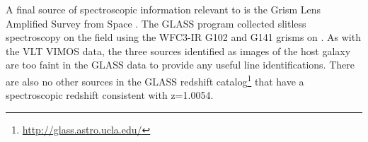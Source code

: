 A final source of spectroscopic information relevant to \spock is the
Grism Lens Amplified Survey from Space \citep[GLASS; PID:
  HST-GO-13459; PI:T. Treu][]{Schmidt:2014,Treu:2015a}. The GLASS
program collected slitless spectroscopy on the  field using
the WFC3-IR G102 and G141 grisms on \HST.  As with the VLT VIMOS data,
the three sources identified as images of the \spock host galaxy are
too faint in the GLASS data to provide any useful line
identifications.  There are also no other sources in the GLASS
redshift catalog\footnote{\url{http://glass.astro.ucla.edu/}} that
have a spectroscopic redshift consistent with z=1.0054.

